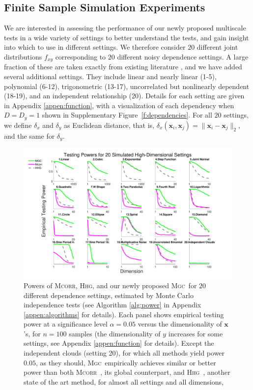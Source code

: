 \documentclass[11pt]{article}
\providecommand{\sct}[1]{{\normalfont\textsc{#1}}}
\providecommand{\mb}[1]{\boldsymbol{#1}}
\newcommand{\Mgc}{\sct{Mgc}}
\newcommand{\Hhg}{\sct{Hhg}}
\newcommand{\Mcorr}{\sct{Mcorr}}
\begin{document}
\subsection*{Finite Sample Simulation Experiments}


We are interested in assessing the performance of our newly proposed multiscale tests in a wide variety of settings to better understand the tests, and gain insight into which to use in different settings.  
We therefore consider $20$ different joint distributions $f_{xy}$ corresponding to $20$ different noisy dependence settings. A large fraction of these are taken exactly from existing literature \cite{SzekelyRizzoBakirov2007, SimonTibshirani2012, GorfineHellerHeller2012, HellerGorfine2013}, and we have added several additional settings.  They include
linear and nearly linear  (1-5),
polynomial   (6-12),
trigonometric (13-17),
uncorrelated but nonlinearly dependent  (18-19),
and an independent relationship (20).
Details for each setting are given in Appendix \ref{appen:function}, with a visualization of each dependency when $D=D_y=1$ shown in Supplementary Figure~\ref{f:dependencies}. For all $20$ settings, we define  $\delta_x$ and $\delta_y$  as  Euclidean distance, that is, $\delta_x(\mb{x}_i,\mb{x}_j) = \|\mb{x}_i - \mb{x}_j\|_{2}$, and the same for $\delta_y$.


\begin{figure}[htbp]
\includegraphics[width=1.0\textwidth]{../Figures/FigHDPower}
\caption{Powers of \Mcorr, \Hhg, and our newly proposed \Mgc~for $20$ different dependence settings, estimated by Monte Carlo independence tests (see Algorithm \ref{alg:power} in Appendix \ref{appen:algorithms} for details).  
Each panel shows empirical testing power at a significance level $\alpha=0.05$
versus the dimensionality of $\mb{x}$'s, for $n=100$ samples (the dimensionality of $y$ increases for some settings, see Appendix \ref{appen:function} for details). 
Except the independent clouds (setting 20), for which all methods yield power $0.05$, as they should, \Mgc~empirically achieves similar or better power than both \Mcorr~\cite{SzekelyRizzo2013a}, its global counterpart, and \Hhg~\cite{HellerGorfine2013}, another state of the art method, for almost all settings and all dimensions, 
}
\label{f:nD}
\end{figure}
\end{document}

